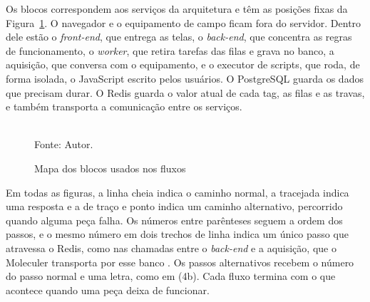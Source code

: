 \par Os blocos correspondem aos serviços da arquitetura e têm as posições fixas da Figura~\ref{fig:fx_mapa}. O navegador e o equipamento de campo ficam fora do servidor. Dentro dele estão o \emph{front-end}, que entrega as telas, o \emph{back-end}, que concentra as regras de funcionamento, o \emph{worker}, que retira tarefas das filas e grava no banco, a aquisição, que conversa com o equipamento, e o executor de scripts, que roda, de forma isolada, o JavaScript escrito pelos usuários. O PostgreSQL guarda os dados que precisam durar. O Redis guarda o valor atual de cada tag, as filas e as travas, e também transporta a comunicação entre os serviços.

\begin{figure}[H]
    \centering
    \caption{Mapa dos blocos usados nos fluxos}
    \label{fig:fx_mapa}
    \vspace{0.4cm}
    \vspace{0.2cm} \\
    Fonte: Autor.
\end{figure}

\par Em todas as figuras, a linha cheia indica o caminho normal, a tracejada indica uma resposta e a de traço e ponto indica um caminho alternativo, percorrido quando alguma peça falha. Os números entre parênteses seguem a ordem dos passos, e o mesmo número em dois trechos de linha indica um único passo que atravessa o Redis, como nas chamadas entre o \emph{back-end} e a aquisição, que o Moleculer transporta por esse banco \cite{MOLECULER_DOCS,REDIS_DOCS}. Os passos alternativos recebem o número do passo normal e uma letra, como em (4b). Cada fluxo termina com o que acontece quando uma peça deixa de funcionar.

